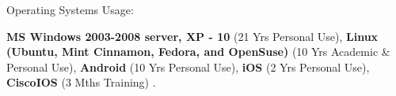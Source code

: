 \begin{cventries}
%    
%    
  \cventry
    {Operating Systems Usage:} %
    {} 
    {} 
    {} 
    {
      \begin{cvitems} %
        \item {
        \textbf{MS Windows 2003-2008 server, XP - 10} (21 Yrs Personal Use), 
        \textbf{Linux (Ubuntu, Mint Cinnamon, Fedora, and OpenSuse)} (10 Yrs Academic \& Personal Use), 
        \textbf{Android} (10 Yrs Personal Use), 
        \textbf{iOS} (2 Yrs Personal Use),
        \textbf{CiscoIOS} (3 Mths Training)
        .} 
      \end{cvitems}
    }  
  \vspace{0.4cm} 
    

\end{cventries}